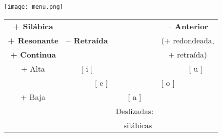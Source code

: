 \documentclass[12pt,landscape]{article}
\begin{document}
\doublespacing

\texttt{[image: menu.png]}

\vspace{-1.65in}
\begin{center}
\hspace{6.5in}
\begin{tabular}{cccccc}
		\hline
		\multicolumn{1}{|c|}{\textbf{+ Silábica}}  & \multicolumn{2}{c|}{}                     & \multicolumn{1}{c|}{} & \multicolumn{2}{c|}{\textbf{-- Anterior}} \\ [-2ex]
		\multicolumn{1}{|c|}{\textbf{+ Resonante}} & \multicolumn{2}{c|}{\phantom{..}\textbf{-- Retraída}\phantom{..}} & \multicolumn{1}{c|}{} & \multicolumn{2}{c|}{\small{(+ redondeada,}} \\ [-2ex]
		\multicolumn{1}{|c|}{\textbf{+ Continua}}  & \multicolumn{2}{c|}{}                     & \multicolumn{1}{c|}{} & \multicolumn{2}{c|}{\small{+ retraída)}} \\
		\hline
		\multicolumn{1}{|c|}{+ Alta}               & \multicolumn{2}{c}{[ i ]}                        & \phantom{thisisfiller} &   & \multicolumn{1}{c|}{[ u ]} \\
		\cline{1-1}
		\multicolumn{1}{|c|}{}                     & \multicolumn{2}{r}{[ e ]\phantom{.}}                        &  & \multicolumn{2}{l|}{\phantom{.}[ o ]}  \\
		\cline{1-1}
		\multicolumn{1}{|c|}{+ Baja}               &                                           &  & [ a ] &   & \multicolumn{1}{c|}{} \\
		\hline
		                     &                                           &  & \multicolumn{1}{|c|}{Deslizadas:} & & \\ [-1ex]
							 &                                           &  & \multicolumn{1}{|c|}{-- silábicas} & & \\
		\cline{4-4}
	\end{tabular}
\end{center}

\begin{center}
\hspace{8in}
\end{center}
\end{document}
